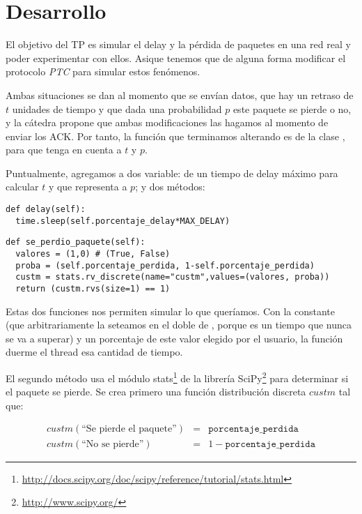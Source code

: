 \section{Desarrollo}

El objetivo del TP es simular el delay y la p\'erdida de paquetes en una red real y poder experimentar con ellos. Asique tenemos que de alguna forma modificar el protocolo \emph{PTC} para simular estos fen\'omenos. 

Ambas situaciones se dan al momento que se env\'ian datos, que hay un retraso de $t$ unidades de tiempo y que dada una probabilidad $p$ este paquete se pierde o no, y la c\'atedra propone que ambas modificaciones las hagamos al momento de enviar los ACK. Por tanto, la funci\'on que terminamos alterando es  de la clase , para que tenga en cuenta a $t$ y $p$. 

Puntualmente, agregamos a  dos variable:  de un tiempo de delay m\'aximo para calcular $t$ y  que representa a $p$; y dos m\'etodos: 

\begin{verbatim}
def delay(self): 
  time.sleep(self.porcentaje_delay*MAX_DELAY)
\end{verbatim}

\begin{verbatim}
def se_perdio_paquete(self):
  valores = (1,0) # (True, False)
  proba = (self.porcentaje_perdida, 1-self.porcentaje_perdida)
  custm = stats.rv_discrete(name="custm",values=(valores, proba))
  return (custm.rvs(size=1) == 1)
\end{verbatim}

Estas dos funciones nos permiten simular lo que quer\'iamos. Con la constante  (que arbitrariamente la seteamos en el doble de , porque es un tiempo que nunca se va a superar) y un porcentaje de este valor elegido por el usuario, la funci\'on  duerme el thread esa cantidad de tiempo. 

El segundo m\'etodo usa el m\'odulo stats\footnote{\url{http://docs.scipy.org/doc/scipy/reference/tutorial/stats.html}} de la librer\'ia SciPy\footnote{\url{http://www.scipy.org/}} para determinar si el paquete se pierde. Se crea primero una funci\'on distribuci\'on discreta $custm$ tal que: 

\begin{eqnarray*}
 custm(\text{``Se pierde el paquete''}) &=& \texttt{porcentaje\_perdida} \\
 custm(\text{``No se pierde''}) &=& 1 - \texttt{porcentaje\_perdida}
\end{eqnarray*}

